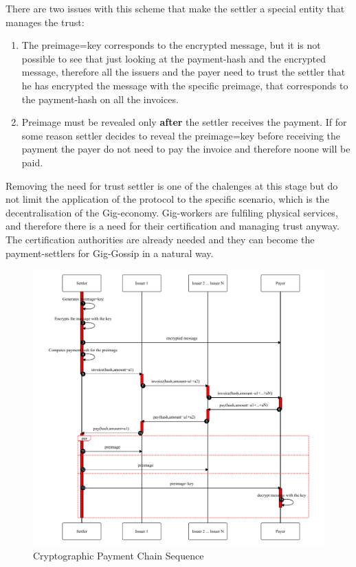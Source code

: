 \documentclass{article}
\begin{document}
There are two issues with this scheme that make the settler a special entity that manages the trust:
\begin{enumerate}
	\item The preimage=key corresponds to the encrypted message, but it is not possible to see that just looking at the payment-hash and the encrypted message, therefore all the issuers and the payer need to trust the settler that he has encrypted the message with the specific preimage, that corresponds to the payment-hash on all the invoices.
	\item Preimage must be revealed only \textbf{after} the settler receives the payment. If for some reason settler decides to reveal the preimage=key before receiving the payment the payer do not need to pay the invoice and therefore noone will be paid.
\end{enumerate}

Removing the need for trust settler is one of the chalenges at this stage but do not limit the application of the protocol to the specific scenario, which is the decentralisation of the Gig-economy. Gig-workers are fulfiling physical services, and therefore there is a need for their certification and managing trust anyway. The certification authorities are already needed and they can become the payment-settlers for Gig-Gossip in a natural way.

\begin{figure}
	\centering
	\includegraphics[scale=0.7]{PaymentChain.pdf}
	\caption{Cryptographic Payment Chain Sequence}
	\label{fig:cryptopaychain}
\end{figure}
\end{document}
